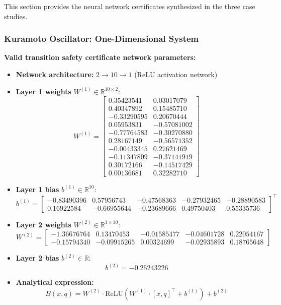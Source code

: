 This section provides the neural network certificates synthesized in the three case studies.

	\subsubsection{Kuramoto Oscillator: One-Dimensional System}
	\label{app:ko1d_neural}
	\textbf{Valid transition safety certificate network parameters:}
	\begin{itemize}
	    \item \textbf{Network architecture:} $2 \rightarrow 10 \rightarrow 1$ (ReLU activation network)
	    \item \textbf{Layer 1 weights} $W^{(1)} \in \mathbb{R}^{10 \times 2}$:
	    \[
	    W^{(1)} = \begin{bmatrix}
	     0.35423541 &  0.03017079 \\
	     0.40347892 &  0.15485710 \\
	    -0.33290595 &  0.20670444 \\
	     0.05953831 & -0.57081002 \\
	    -0.77764583 & -0.30270880 \\
	     0.28167149 & -0.56571352 \\
	    -0.00433345 &  0.27621469 \\
	    -0.11347809 & -0.37141919 \\
	     0.30172166 & -0.14517429 \\
	     0.00136681 &  0.32282710
	    \end{bmatrix}
	    \]
	    
	    \item \textbf{Layer 1 bias} $b^{(1)} \in \mathbb{R}^{10}$:
	    \[
	    b^{(1)} = \begin{bmatrix}
	    -0.83490396 &  0.57956743 & -0.47568363 & -0.27932465 & -0.28890583 \\
	     0.16922584 & -0.66955644 & -0.23689666 &  0.49750403 &  0.55335736
	    \end{bmatrix}^\top
	    \]
	    
	    \item \textbf{Layer 2 weights} $W^{(2)} \in \mathbb{R}^{1 \times 10}$:
	    \[
	    W^{(2)} = \begin{bmatrix}
	    -1.36676764 &  0.13470453 & -0.01585477 & -0.04601728 &  0.22054167 \\
	    -0.15794340 & -0.09915265 &  0.00324699 & -0.02935893 &  0.18765648
	    \end{bmatrix}
	    \]
	    
	    \item \textbf{Layer 2 bias} $b^{(2)} \in \mathbb{R}$:
	    \[
	    b^{(2)} = -0.25243226
	    \]
	    
	    \item \textbf{Analytical expression:}
	    \[
	    B(x, q) = W^{(2)} \cdot \text{ReLU}(W^{(1)} \cdot [x, q]^\top + b^{(1)}) + b^{(2)}
	    \]
	\end{itemize}

